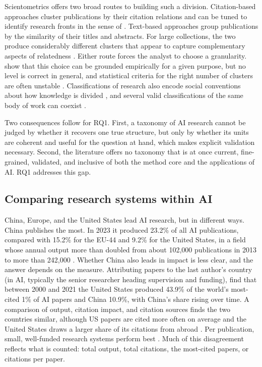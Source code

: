 \documentclass[10pt,twocolumn,a4paper]{article}
\begin{document}
	Scientometrics offers two broad routes to building such a division. Citation-based approaches cluster publications by their citation relations \parencite{waltman2012new} and can be tuned to identify research fronts in the sense of \textcite{price1965networks}. Text-based approaches group publications by the similarity of their titles and abstracts. For large collections, the two produce considerably different clusters that appear to capture complementary aspects of relatedness \parencite{boyack2020comparison}. Either route forces the analyst to choose a granularity. \textcite{sjogarde2018granularity} show that this choice can be grounded empirically for a given purpose, but no level is correct in general, and statistical criteria for the right number of clusters are often unstable \parencite{bulatov2024determination}. Classifications of research also encode social conventions about how knowledge is divided \parencite{stichweh_1992_sociology_disciplines}, and several valid classifications of the same body of work can coexist \parencite{rafols_2025_multiple_ontologies}.
	
	Two consequences follow for RQ1. First, a taxonomy of AI research cannot be judged by whether it recovers one true structure, but only by whether its units are coherent and useful for the question at hand, which makes explicit validation necessary. Second, the literature offers no taxonomy that is at once current, fine-grained, validated, and inclusive of both the method core and the applications of AI. RQ1 addresses this gap.
	
	\subsection{Comparing research systems within AI}
	\label{sec:lit_comparison}
	
	China, Europe, and the United States lead AI research, but in different ways. China publishes the most. In 2023 it produced 23.2\% of all AI publications, compared with 15.2\% for the EU-44 and 9.2\% for the United States, in a field whose annual output more than doubled from about 102,000 publications in 2013 to more than 242,000 \parencite{maslej2025artificial}. Whether China also leads in impact is less clear, and the answer depends on the measure. Attributing papers to the last author's country (in AI, typically the senior researcher heading supervision and funding), \textcite{alshebli2024china} find that between 2000 and 2021 the United States produced 43.9\% of the world's most-cited 1\% of AI papers and China 10.9\%, with China's share rising over time. A comparison of output, citation impact, and citation sources finds the two countries similar, although US papers are cited more often on average and the United States draws a larger share of its citations from abroad \parencite{min2026has}. Per publication, small, well-funded research systems perform best \parencite{almarzouqi2024comparative}. Much of this disagreement reflects what is counted: total output, total citations, the most-cited papers, or citations per paper.
	
\end{document}
